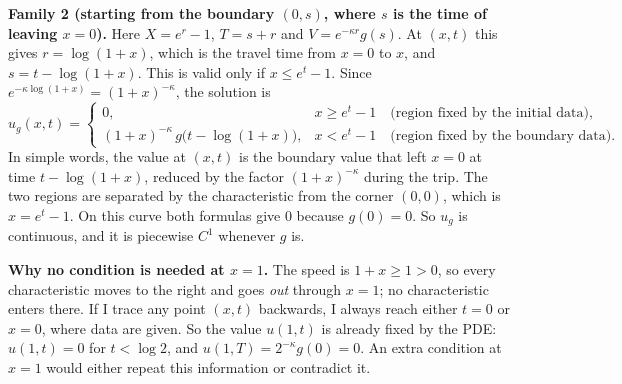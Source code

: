 \documentclass[10pt,a4paper]{article}
\begin{document}
\textbf{Family 2 (starting from the boundary $(0,s)$, where $s$ is the time of leaving $x=0$).} Here $X=e^r-1$, $T=s+r$ and $V=e^{-\kappa r}g(s)$. At $(x,t)$ this gives $r=\log(1+x)$, which is the travel time from $x=0$ to $x$, and $s=t-\log(1+x)$. This is valid only if $x\le e^t-1$. Since $e^{-\kappa\log(1+x)}=(1+x)^{-\kappa}$, the solution is
\begin{equation}
u_g(x,t)=\begin{cases}0, & x\ge e^t-1 \quad\text{(region fixed by the initial data)},\\[1pt]
(1+x)^{-\kappa}\,g\bigl(t-\log(1+x)\bigr), & x<e^t-1\quad\text{(region fixed by the boundary data)}.\end{cases}
\label{eq:sol}
\end{equation}
In simple words, the value at $(x,t)$ is the boundary value that left $x=0$ at time $t-\log(1+x)$, reduced by the factor $(1+x)^{-\kappa}$ during the trip. The two regions are separated by the characteristic from the corner $(0,0)$, which is $x=e^t-1$. On this curve both formulas give $0$ because $g(0)=0$. So $u_g$ is continuous, and it is piecewise $C^1$ whenever $g$ is.

\textbf{Why no condition is needed at $x=1$.} The speed is $1+x\ge1>0$, so every characteristic moves to the right and goes \emph{out} through $x=1$; no characteristic enters there. If I trace any point $(x,t)$ backwards, I always reach either $t=0$ or $x=0$, where data are given. So the value $u(1,t)$ is already fixed by the PDE: $u(1,t)=0$ for $t<\log2$, and $u(1,T)=2^{-\kappa}g(0)=0$. An extra condition at $x=1$ would either repeat this information or contradict it.
\end{document}
